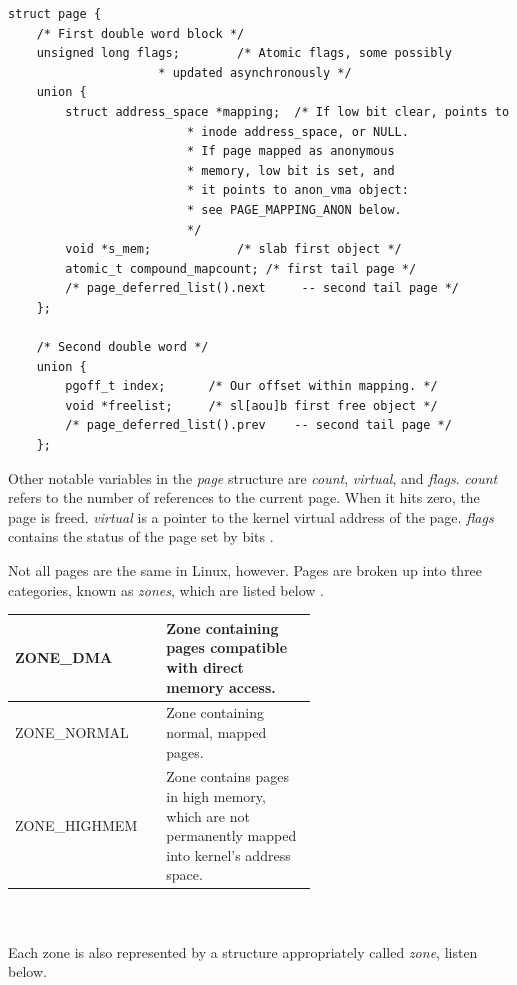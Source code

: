 \documentclass[10pt,draftclsnofoot,onecolumn,journal,compsoc]{IEEEtran}
\begin{document}
\begin{lstlisting}[caption={An excerpt from the \textit{page} structure in the linux/mm.h file.}]
struct page {
	/* First double word block */
	unsigned long flags;		/* Atomic flags, some possibly
					 * updated asynchronously */
	union {
		struct address_space *mapping;	/* If low bit clear, points to
						 * inode address_space, or NULL.
						 * If page mapped as anonymous
						 * memory, low bit is set, and
						 * it points to anon_vma object:
						 * see PAGE_MAPPING_ANON below.
						 */
		void *s_mem;			/* slab first object */
		atomic_t compound_mapcount;	/* first tail page */
		/* page_deferred_list().next	 -- second tail page */
	};

	/* Second double word */
	union {
		pgoff_t index;		/* Our offset within mapping. */
		void *freelist;		/* sl[aou]b first free object */
		/* page_deferred_list().prev	-- second tail page */
	};
\end{lstlisting}
Other notable variables in the \textit{page} structure are \textit{count}, \textit{virtual}, and \textit{flags}. \textit{count} refers to the number of references to the current page. When it hits zero, the page is freed. \textit{virtual} is a pointer to the kernel virtual address of the page. \textit{flags} contains the status of the page set by bits \cite{linux_proc}. 

Not all pages are the same in Linux, however. Pages are broken up into three categories, known as \textit{zones}, which are listed below \cite{linux_proc}. \\

\begin{tabular}{ | p{0.2\linewidth} | p{0.4\linewidth} |}
    \hline
    ZONE\_DMA & Zone containing pages compatible with direct memory access.\\ \hline
    ZONE\_NORMAL & Zone containing normal, mapped pages.\\ \hline
    ZONE\_HIGHMEM & Zone contains pages in high memory, which are not permanently 		mapped into kernel's address space.\\ \hline
\end{tabular} \\ \\ 
Each zone is also represented by a structure appropriately called \textit{zone}, listen below.
\end{document}
